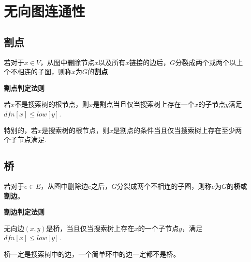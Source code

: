 \section{无向图连通性}

\subsection{割点}

若对于$x\in V$，从图中删除节点$x$以及所有$x$链接的边后，$G$分裂成两个或两个以上个不相连的子图，则称$x$为$G$的\textbf{割点}

\textbf{割点判定法则}

若$x$不是搜索树的根节点，则$x$是割点当且仅当搜索树上存在一个$x$的子节点$y$满足$dfn[x]\le low[y]$.

特别的，若$x$是搜索树的根节点，则$x$是割点的条件当且仅当搜索树上存在至少两个子节点满足.



\subsection{桥}
若对于$e \in E $，从图中删除边$e$之后，$G$分裂成两个不相连的子图，则称$e$为$G$的\textbf{桥}或\textbf{割边}。

\textbf{割边判定法则}

无向边$(x,y)$是桥，当且仅当搜索树上存在$x$的一个子节点$y$，满足$dfn[x]\le low[y]$.

桥一定是搜索树中的边，一个简单环中的边一定都不是桥。



